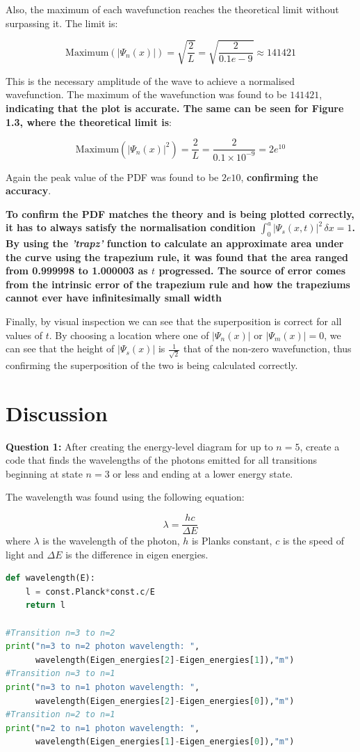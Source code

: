 Also, the maximum of each wavefunction reaches the theoretical limit without surpassing it. The limit is:

$$ \text{Maximum}(|\Psi_n(x)|) = \sqrt{\frac{2}{L}} = \sqrt{\frac{2}{0.1e-9}} \approx  141421 $$

This is the necessary amplitude of the wave to achieve a normalised wavefunction.
The maximum of the wavefunction was found to be $141421$, \textbf{indicating that the plot is accurate. The same can be seen for Figure 1.3, where the theoretical limit is}:

$$ \text{Maximum}(|\Psi_n(x)|^{2}) = \frac{2}{L} = \frac{2}{0.1 \times 10^{-9}} = 2e^{10} $$

Again the peak value of the PDF was found to be $2e10$, \textbf{confirming the accuracy}.

\textbf{To confirm the PDF matches the theory and is being plotted correctly, it has to always satisfy the normalisation condition $\int_{0}^{a} |\Psi_s(x,t)|^{2} \,\delta x = 1$. By using the \textit{'trapz'} function to calculate an approximate area under the curve using the trapezium rule, it was found that the area ranged from 0.999998 to 1.000003 as $t$ progressed. The source of error comes from the intrinsic error of the trapezium rule and how the trapeziums cannot ever have infinitesimally small width}

Finally, by visual inspection we can see that the superposition is correct for all values of $t$. By choosing a location where one of $|\Psi_n(x)|$ or $|\Psi_m(x)| = 0$, we can see that the height of $|\Psi_s(x)|$ is $\frac{1}{\sqrt{2}}$ that of the non-zero wavefunction, thus confirming the superposition of the two is being calculated correctly. 

\section{Discussion}
\textbf{Question 1:}
After creating the energy-level diagram for up to $n=5$, create a code that finds the wavelengths of the photons emitted for all transitions beginning at state $n=3$ or less and ending at a lower energy state.

The wavelength was found using the following equation:

\[\lambda = \frac{hc}{\Delta E}\]
where $\lambda$ is the wavelength of the photon, $h$ is Planks constant, $c$ is the speed of light and $\Delta E$ is the difference in eigen energies.

\begin{lstlisting}[language=Python]
def wavelength(E):
    l = const.Planck*const.c/E
    return l

#Transition n=3 to n=2
print("n=3 to n=2 photon wavelength: ", 
      wavelength(Eigen_energies[2]-Eigen_energies[1]),"m")
#Transition n=3 to n=1
print("n=3 to n=1 photon wavelength: ", 
      wavelength(Eigen_energies[2]-Eigen_energies[0]),"m")
#Transition n=2 to n=1
print("n=2 to n=1 photon wavelength: ", 
      wavelength(Eigen_energies[1]-Eigen_energies[0]),"m")
\end{lstlisting}

